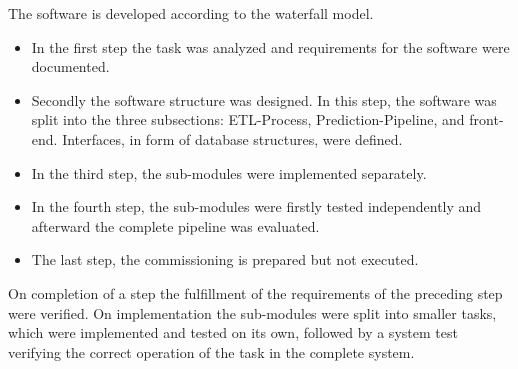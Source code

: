 The software is developed according to the waterfall model.
\begin{itemize}
\item In the first step the task was analyzed and requirements for the software were documented.

\item Secondly the software structure was designed. 
In this step, the software was split into the three subsections: ETL-Process, Prediction-Pipeline, and front-end.
Interfaces, in form of database structures, were defined. 

\item In the third step, the sub-modules were implemented separately.

\item In the fourth step, the sub-modules were firstly tested independently and afterward the complete pipeline was evaluated.

\item The last step, the commissioning is prepared but not executed.

\end{itemize}
On completion of a step the fulfillment of the requirements of the preceding step were verified.
On implementation the sub-modules were split into smaller tasks, which were implemented and tested on its own, followed by a system test verifying the correct operation of the task in the complete system. 
